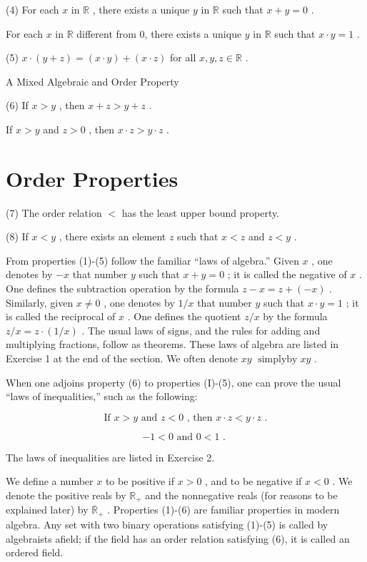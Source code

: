 (4) For each \(x\) in \(\mathbb{R}\) , there exists a unique \(y\) in \(\mathbb{R}\) such that \(x + y = 0\) .

For each \(x\) in \(\mathbb{R}\) different from 0, there exists a unique \(y\) in \(\mathbb{R}\) such that \(x \cdot  y = 1\) .

(5) \(x \cdot  \left( {y + z}\right)  = \left( {x \cdot  y}\right)  + \left( {x \cdot  z}\right)\) for all \(x,y,z \in  \mathbb{R}\) .

A Mixed Algebraic and Order Property

(6) If \(x > y\) , then \(x + z > y + z\) .

If \(x > y\) and \(z > 0\) , then \(x \cdot  z > y \cdot  z\) .

\section*{Order Properties}

(7) The order relation \(<\) has the least upper bound property.

(8) If \(x < y\) , there exists an element \(z\) such that \(x < z\) and \(z < y\) .

From properties (1)-(5) follow the familiar ``laws of algebra.'' Given \(x\) , one denotes by \(- x\) that number \(y\) such that \(x + y = 0\) ; it is called the negative of \(x\) . One defines the subtraction operation by the formula \(z - x = z + \left( {-x}\right)\) . Similarly, given \(x \neq  0\) , one denotes by \(1/x\) that number \(y\) such that \(x \cdot  y = 1\) ; it is called the reciprocal of \(x\) . One defines the quotient \(z/x\) by the formula \(z/x = z \cdot  \left( {1/x}\right)\) . The usual laws of signs, and the rules for adding and multiplying fractions, follow as theorems. These laws of algebra are listed in Exercise 1 at the end of the section. We often denote \(xy\)  \(\operatorname{simplyby}{xy}\) .

When one adjoins property (6) to properties (I)-(5), one can prove the usual ``laws of inequalities,'' such as the following:

\[
\text{ If }x > y\text{ and }z < 0\text{ , then }x \cdot  z < y \cdot  z\text{ . }
\]

\[
- 1 < 0\text{ and }0 < 1\text{ . }
\]

The laws of inequalities are listed in Exercise 2.

We define a number \(x\) to be positive if \(x > 0\) , and to be negative if \(x < 0\) . We denote the positive reals by \({\mathbb{R}}_{ + }\) and the nonnegative reals (for reasons to be explained later) by \({\overline{\mathbb{R}}}_{ + }\) . Properties (1)-(6) are familiar properties in modern algebra. Any set with two binary operations satisfying (1)-(5) is called by algebraists afield; if the field has an order relation satisfying (6), it is called an ordered field.

